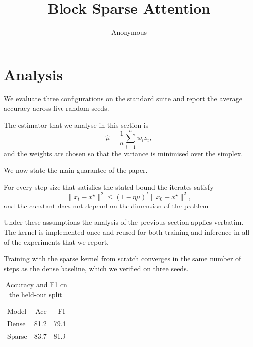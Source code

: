 \documentclass[10pt,twocolumn]{article}
\title{Block Sparse Attention}
\author{Anonymous}
\date{}
\newcommand{\s}[1]{#1}
\newcommand{\sq}[1]{}
\begin{document}
\maketitle

\section{Analysis}

\s{We evaluate three configurations on the standard suite and report the average accuracy across five random seeds.}

\sq{The estimator that we analyse in this section is and the weights are chosen so that the variance is minimised over the simplex.}
The estimator that we analyse in this section is
\begin{equation}
\hat{\mu} = \frac{1}{n}\sum_{i=1}^{n} w_i z_i ,
\end{equation}
and the weights are chosen so that the variance is minimised over the simplex.

\s{We now state the main guarantee of the paper.}

\sq{For every step size that satisfies the stated bound the iterates satisfy and the constant does not depend on the dimension of the problem.}
For every step size that satisfies the stated bound the iterates satisfy
\begin{equation}
\|x_t - x^\star\|^2 \le (1-\eta\mu)^t \|x_0 - x^\star\|^2 ,
\end{equation}
and the constant does not depend on the dimension of the problem.

\s{Under these assumptions the analysis of the previous section applies verbatim.}
\s{The kernel is implemented once and reused for both training and inference in all of the experiments that we report.}

\s{Training with the sparse kernel from scratch converges in the same number of steps as the dense baseline, which we verified on three seeds.}

\begin{table}[h]\centering
\begin{tabular}{lrr}
Model & Acc & F1 \\
Dense & 81.2 & 79.4 \\
Sparse & 83.7 & 81.9 \\
\end{tabular}
\caption{Accuracy and F1 on the held-out split.}
\end{table}
\end{document}

